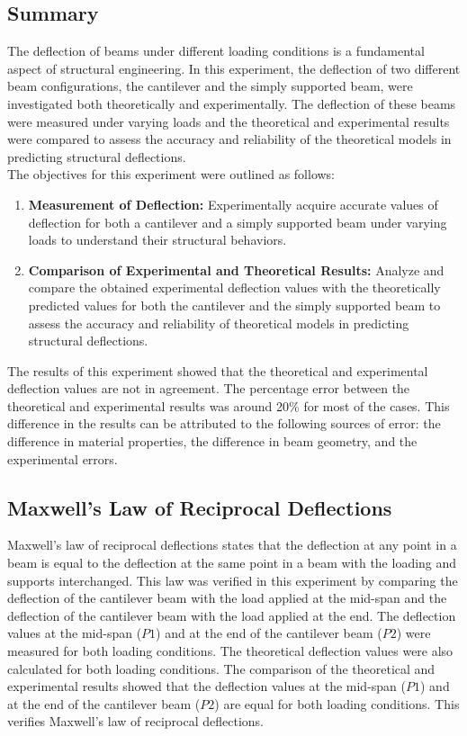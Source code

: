 \documentclass[12pt, titlepage]{article}
\begin{document}
\subsection{Summary}
The deflection of beams under different loading conditions is a fundamental
aspect of structural engineering. In this experiment, the deflection of two
different beam configurations, the cantilever and the simply supported beam,
were investigated both theoretically and experimentally. The deflection of
these beams were measured under varying loads and the theoretical and
experimental results were compared to assess the accuracy and reliability of
the theoretical models in predicting structural deflections.\\[10pt]
The objectives for this experiment were outlined as follows:
\begin{enumerate}
    \item \textbf{Measurement of Deflection:} Experimentally acquire accurate
      values of deflection for both a cantilever and a simply supported beam
      under varying loads to understand their structural behaviors.
    
    \item \textbf{Comparison of Experimental and Theoretical Results:} Analyze
      and compare the obtained experimental deflection values with the
      theoretically predicted values for both the cantilever and the simply
      supported beam to assess the accuracy and reliability of theoretical
      models in predicting structural deflections.
\end{enumerate}
The results of this experiment showed that the theoretical and experimental
deflection values are not in agreement. The percentage error between the
theoretical and experimental results was around 20\% for most of the cases.
This difference in the results can be attributed to the following sources of
error: the difference in material properties, the difference in beam geometry,
and the experimental errors.
\subsection{Maxwell's Law of Reciprocal Deflections}
Maxwell's law of reciprocal deflections states that the deflection at any point
in a beam is equal to the deflection at the same point in a beam with the
loading and supports interchanged. This law was verified in this experiment by
comparing the deflection of the cantilever beam with the load applied at the
mid-span and the deflection of the cantilever beam with the load applied at the
end. The deflection values at the mid-span (\(P1\)) and at the end of the
cantilever beam (\(P2\)) were measured for both loading conditions. The
theoretical deflection values were also calculated for both loading conditions.
The comparison of the theoretical and experimental results showed that the
deflection values at the mid-span (\(P1\)) and at the end of the cantilever
beam (\(P2\)) are equal for both loading conditions. This verifies Maxwell's
law of reciprocal deflections.
\end{document}
